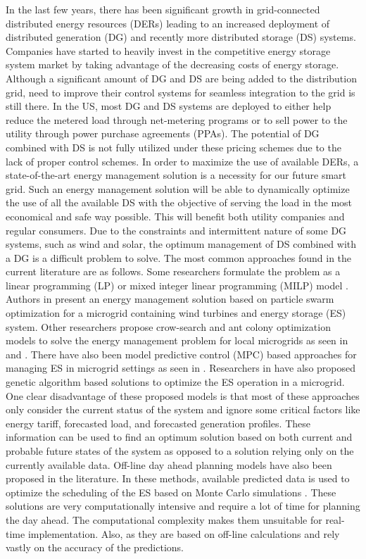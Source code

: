 In the last few years, there has been significant growth in grid-connected distributed energy resources (DERs) leading to an increased deployment of distributed generation (DG) and recently more distributed storage (DS) systems. Companies have started to heavily invest in the competitive energy storage system market by taking advantage of the decreasing costs of energy storage. Although a significant amount of DG and DS are being added to the distribution grid, need to improve their control systems for seamless integration to the grid is still there. In the US, most DG and DS systems are deployed to either help reduce the metered load through net-metering programs or to sell power to the utility through power purchase agreements (PPAs). The potential of DG combined with DS is not fully utilized under these pricing schemes due to the lack of proper control schemes. In order to maximize the use of available DERs, a state-of-the-art energy management solution is a necessity for our future smart grid. Such an energy management solution will be able to dynamically optimize the use of all the available DS with the objective of serving the load in the most economical and safe way possible. This will benefit both utility companies and regular consumers. Due to the constraints and intermittent nature of some DG systems, such as wind and solar, the optimum management of DS combined with a DG is a difficult problem to solve. The most common approaches found in the current literature are as follows. Some researchers formulate the problem as a linear programming (LP) or mixed integer linear programming (MILP) model \cite{lp73, lp74, lp75}. Authors in \cite{pso80, pso81} present an energy management solution based on particle swarm optimization for a microgrid containing wind turbines and energy storage (ES) system. Other researchers propose crow-search and ant colony optimization models to solve the energy management problem for local microgrids as seen in \cite{csa87} and \cite{aco84}. There have also been model predictive control (MPC) based approaches for managing ES in microgrid settings as seen in \cite{energymanajaboulay,mpcmorstyn}.  Researchers in \cite{ga76, ga77} have also proposed genetic algorithm based solutions to optimize the ES operation in a microgrid. One clear disadvantage of these proposed models is that most of these approaches only consider the current status of the system and ignore some critical factors like energy tariff, forecasted load, and forecasted generation profiles.  These information can be used to find an optimum solution based on both current and probable future states of the system as opposed to a solution relying only on the currently available data. Off-line day ahead planning models have also been proposed in the literature. In these methods, available predicted data is used to optimize the scheduling of the ES based on Monte Carlo simulations \cite{6872821,7010943,6839110}. These solutions are very computationally intensive and require a lot of time for planning the day ahead. The computational complexity makes them unsuitable for real-time implementation. Also, as they are based on off-line calculations and rely vastly on the accuracy of the predictions.

